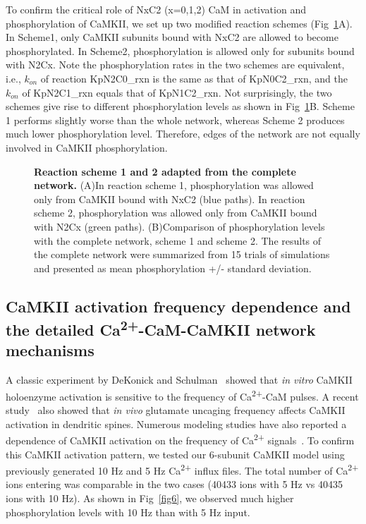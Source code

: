 \documentclass[10pt,letterpaper]{article}
\begin{document}
To confirm the critical role of NxC2 (x=0,1,2) CaM in activation and phosphorylation of CaMKII, we set up two modified reaction schemes (Fig~\ref{fig5}A). In Scheme1, only CaMKII subunits bound with NxC2 are allowed to become phosphorylated. In Scheme2, phosphorylation is allowed only for subunits bound with N2Cx. Note the phosphorylation rates in the two schemes are equivalent, i.e., $k_{on}$ of reaction KpN2C0\_rxn is the same as that of KpN0C2\_rxn, and the $k_{on}$ of KpN2C1\_rxn equals that of KpN1C2\_rxn. Not surprisingly, the two schemes give rise to different phosphorylation levels as shown in Fig~\ref{fig5}B. Scheme 1 performs slightly worse than the whole network, whereas Scheme 2 produces much lower phosphorylation level. Therefore, edges of the network are not equally involved in CaMKII phosphorylation. 

\begin{figure}[!h]
	\caption{{\bf Reaction scheme 1 and 2 adapted from the complete network.}
	(A)In reaction scheme 1, phosphorylation was allowed only from CaMKII bound with NxC2 (blue paths). In reaction scheme 2, phosphorylation was allowed only from CaMKII bound with N2Cx (green paths).
	(B)Comparison of phosphorylation levels with the complete network, scheme 1 and scheme 2. The results of the complete network were summarized from 15 trials of simulations and presented as mean phosphorylation +/- standard deviation.
	} 
\label{fig5}
\end{figure}

\subsection*{CaMKII activation frequency dependence and the detailed Ca\textsuperscript{2+}-CaM-CaMKII network mechanisms}

A classic experiment by DeKonick and Schulman~\cite{DeKoninck:1998wh} showed that \textit{in vitro} CaMKII holoenzyme activation is sensitive to the frequency of Ca\textsuperscript{2+}-CaM pulses. A recent study~\cite{Fujii:2013bg} also showed that \textit{in vivo} glutamate uncaging frequency affects CaMKII activation in dendritic spines. Numerous modeling studies have also reported a dependence of CaMKII activation on the frequency of Ca\textsuperscript{2+} signals~\cite{Pepke:2010ju,Dupont:2003vq,Michalski:2012ds,Kubota:2001ul}. To confirm this CaMKII activation pattern, we tested our 6-subunit CaMKII model using previously generated 10 Hz and 5 Hz Ca\textsuperscript{2+} influx files. The total number of Ca\textsuperscript{2+} ions entering was comparable in the two cases (40433 ions with 5 Hz vs 40435 ions with 10 Hz). As shown in Fig~\ref{fig6}, we observed much higher phosphorylation levels with 10 Hz than with 5 Hz input.
\end{document}
